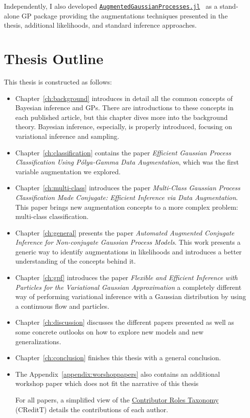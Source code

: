 Independently, I also developed \href{https://github.com/theogf/AugmentedGaussianProcesses.jl}{\texttt{AugmentedGaussianProcesses.jl}}~\cite{theo_galy_fajou_2021_5728215} as a stand-alone \ac{GP} package providing the augmentations techniques presented in the thesis, additional likelihoods, and standard inference approaches.

\section{Thesis Outline}

This thesis is constructed as follows:
\begin{itemize}
    \item Chapter~\ref{ch:background} introduces in detail all the common concepts of Bayesian inference and \acp{GP}.
    There are introductions to these concepts in each published article, but this chapter dives more into the background theory.
    Bayesian inference, especially, is properly introduced, focusing on variational inference and sampling.
    \item Chapter~\ref{ch:classification} contains the paper \textit{Efficient Gaussian Process Classification Using P\'olya-Gamma Data Augmentation}, which was the first variable augmentation we explored.
    \item Chapter~\ref{ch:multi-class} introduces the paper \textit{Multi-Class Gaussian Process Classification Made Conjugate: Efficient Inference via Data Augmentation}.
    This paper brings new augmentation concepts to a more complex problem: multi-class classification.
    \item Chapter~\ref{ch:general} presents the paper \textit{Automated Augmented Conjugate Inference for Non-conjugate Gaussian Process Models}.
    This work presents a generic way to identify augmentations in likelihoods and introduces a better understanding of the concepts behind it.
    \item Chapter~\ref{ch:gpf} introduces the paper \textit{Flexible and Efficient Inference with Particles for the Variational Gaussian Approximation } a completely different way of performing variational inference with a Gaussian distribution by using a continuous flow and particles.
    \item Chapter~\ref{ch:discussion} discusses the different papers presented as well as some concrete outlooks on how to explore new models and new generalizations.
    \item Chapter~\ref{ch:conclusion} finishes this thesis with a general conclusion.
    \item The Appendix~\ref{appendix:worshoppapers} also contains an additional workshop paper which does not fit the narrative of this thesis 

    For all papers, a simplified view of the \href{https://mdpi-res.com/data/contributor-role-instruction.pdf}{Contributor Roles Taxonomy} (CReditT) details the contributions of each author.

\end{itemize}

